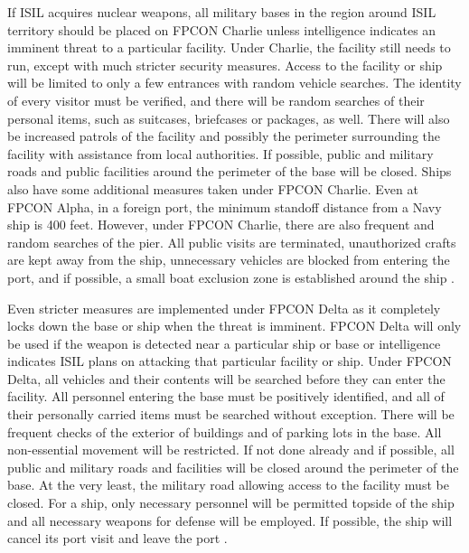\documentclass{report}
\begin{document}
If ISIL acquires nuclear weapons, all military bases in the region around ISIL territory should be placed on FPCON Charlie unless intelligence indicates an imminent threat to a particular facility.  Under Charlie, the facility still needs to run, except with much stricter security measures.  Access to the facility or ship will be limited to only a few entrances with random vehicle searches.  The identity of every visitor must be verified, and there will be random searches of their personal items, such as suitcases, briefcases or packages, as well.  There will also be increased patrols of the facility and possibly the perimeter surrounding the facility with assistance from local authorities.  If possible, public and military roads and public facilities around the perimeter of the base will be closed.  Ships also have some additional measures taken under FPCON Charlie.  Even at FPCON Alpha, in a foreign port, the minimum standoff distance from a Navy ship is 400 feet.  However, under FPCON Charlie, there are also frequent and random searches of the pier.  All public visits are terminated, unauthorized crafts are kept away from the ship, unnecessary vehicles are blocked from entering the port, and if possible, a small boat exclusion zone is established around the ship \cite{Usd2006}. 

Even stricter measures are implemented under FPCON Delta as it completely locks down the base or ship when the threat is imminent.  FPCON Delta will only be used if the weapon is detected near a particular ship or base or intelligence indicates ISIL plans on attacking that particular facility or ship.  Under FPCON Delta, all vehicles and their contents will be searched before they can enter the facility.  All personnel entering the base must be positively identified, and all of their personally carried items must be searched without exception.  There will be frequent checks of the exterior of buildings and of parking lots in the base.  All non-essential movement will be restricted.  If not done already and if possible, all public and military roads and facilities will be closed around the perimeter of the base.  At the very least, the military road allowing access to the facility must be closed.  For a ship, only necessary personnel will be permitted topside of the ship and all necessary weapons for defense will be employed.  If possible, the ship will cancel its port visit and leave the port \cite{Usd2006}.
\end{document}
